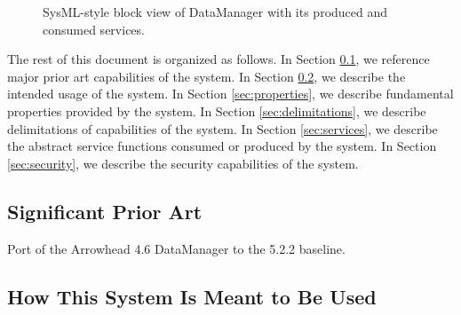 \documentclass[a4paper]{arrowhead}
\begin{document}
\begin{figure}[ht!]
  \centering
  \caption{SysML-style block view of DataManager with its produced and consumed services.}
  \label{fig:system}
\end{figure}

The rest of this document is organized as follows.
In Section \ref{sec:prior_art}, we reference major prior art capabilities of the system.
In Section \ref{sec:use}, we describe the intended usage of the system.
In Section \ref{sec:properties}, we describe fundamental properties provided by the system.
In Section \ref{sec:delimitations}, we describe delimitations of capabilities of the system.
In Section \ref{sec:services}, we describe the abstract service functions consumed or produced by the system.
In Section \ref{sec:security}, we describe the security capabilities of the system.

\newpage

\subsection{Significant Prior Art}
\label{sec:prior_art}

Port of the Arrowhead 4.6 DataManager to the 5.2.2 baseline.

\subsection{How This System Is Meant to Be Used}
\label{sec:use}
\end{document}
